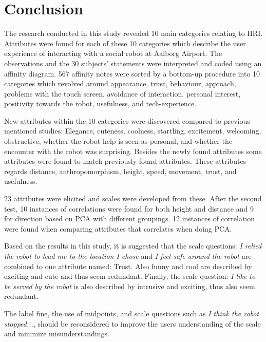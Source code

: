 \section{Conclusion}
\label{Conclusion}
%
The research conducted in this study revealed 10 main categories relating to HRI. Attributes were found for each of these 10 categories which describe the user experience of interacting with a social robot at Aalborg Airport. The observations and the 30 subjects' statements were interpreted and coded using an affinity diagram. 567 affinity notes were sorted by a bottom-up procedure into 10 categories which revolved around appearance, trust, behaviour, approach, problems with the touch screen, avoidance of interaction, personal interest, positivity towards the robot, usefulness, and tech-experience.

New attributes within the 10 categories were discovered compared to previous mentioned studies: Elegance, cuteness, coolness, startling, excitement, welcoming, obstructive, whether the robot help is seen as personal, and whether the encounter with the robot was surprising. Besides the newly found attributes some attributes were found to match previously found attributes. These attributes regards distance, anthropomorphism, height, speed, movement, trust, and usefulness.

23 attributes were elicited and scales were developed from these. After the second test, 10 instances of correlations were found for both height and distance and 9 for direction based on PCA with different groupings. 12 instances of correlation were found when comparing attributes that correlates when doing PCA.

Based on the results in this study, it is suggested that the scale questions: \textit{I relied the robot to lead me to the location I chose} and \textit{I feel safe around the robot} are combined to one attribute named: Trust. Also funny and cool are described by exciting and cute and thus seem redundant. Finally, the scale question: \textit{I like to be served by the robot} is also described by intrusive and exciting, thus also seem redundant.

The label fine, the use of midpoints, and scale questions such as \textit{I think the robot stopped...}, should be reconsidered to improve the users understanding of the scale and minimize misunderstandings. 


